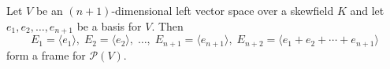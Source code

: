 Let $V$ be an $(n+1)$-dimensional left vector space over a skewfield $K$ and let $e_1, e_2, \dots, e_{n+1}$ be a basis for $V$. Then
$$E_1 = \langle e_1 \rangle,\; E_2 = \langle e_2 \rangle,\; \dots,\; E_{n+1} = \langle e_{n+1} \rangle,\; E_{n+2} = \langle e_1 + e_2 + \cdots + e_{n+1} \rangle$$
form a frame for $\mathcal{P}(V)$.
